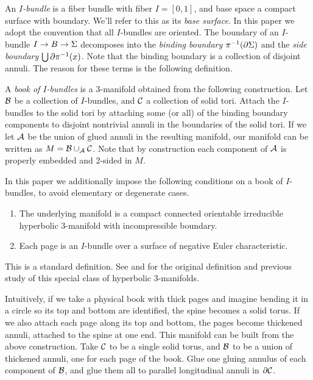 \begin{defn}\label{D:boib}

An \emph{$I$-bundle} is a fiber bundle with fiber $I=[0,1]$, and base space
a compact surface with boundary. We'll refer to this as its \emph{base
surface}.  In this paper we adopt the convention that all $I$-bundles are
oriented.  The boundary of an $I$-bundle $I \to B \to \Sigma$ decomposes into the
\emph{binding boundary} $\pi^{-1}(\partial \Sigma)$ and the \emph{side boundary}
$\bigcup \partial \pi^{-1}(x)$. Note that the binding boundary is a collection of
disjoint annuli. The reason for these terms is the following definition.

A \emph{book of $I$-bundles} is a $3$-manifold obtained from the following
construction. Let $\mathcal{B}$ be a collection of $I$-bundles, and $\mathcal{C}$ a collection
of solid tori. Attach the $I$-bundles to the solid tori by attaching some (or
all) of the binding boundary components to disjoint nontrivial annuli in the
boundaries of the solid tori.  If we let $\mathcal{A}$ be the union of glued annuli in
the resulting manifold, our manifold can be written as $M=\mathcal{B} \cup_{\mathcal{A}} \mathcal{C}$.
Note that by construction each component of $\mathcal{A}$ is properly embedded and
2-sided in $M$.

In this paper we additionally impose the following conditions on a book of
$I$-bundles, to avoid elementary or degenerate cases.

\begin{enumerate}

\item The underlying manifold is a compact connected orientable irreducible
hyperbolic $3$-manifold with incompressible boundary.

\item Each page is an $I$-bundle over a surface of negative Euler
characteristic.

\end{enumerate}

\end{defn}

This is a standard definition. See \cite[pp286]{CS} and \cite[Definition
2.1]{ACS} for the original definition and previous study of this special class
  of hyperbolic $3$-manifolds.

Intuitively, if we take a physical book with thick pages and imagine bending it
in a circle so its top and bottom are identified, the spine becomes a solid
torus.  If we also attach each page along its top and bottom, the pages become
thickened annuli, attached to the spine at one end. This manifold can be built
from the above construction. Take $\mathcal{C}$ to be a single solid torus, and $\mathcal{B}$
to be a union of thickened annuli, one for each page of the book. Glue one
gluing annulus of each component of $\mathcal{B}$, and glue them all to parallel
longitudinal annuli in $\partial \mathcal{C}$.


